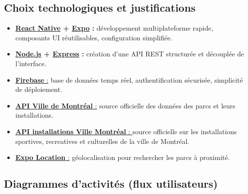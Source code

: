 \documentclass[12pt,a4paper]{article}
\begin{document}
\subsection{Choix technologiques et justifications}

\begin{itemize}
  \item \textbf{\href{https://reactnativeelements.com/docs}{React Native} + \href{https://expo.dev/}{Expo} :} développement multiplateforme rapide, composants UI réutilisables, configuration simplifiée.
  \item \textbf{\href{https://nodejs.org/fr}{Node.js} + \href{https://expressjs.com/}{Express} :} création d'une API REST structurée et découplée de l'interface.
  \item \href{https://www.googleadservices.com/pagead/aclk?sa=L&ai=DChsSEwiM4Orq6PmOAxViNwgFHbacK74YACICCAEQABoCbWQ&ae=2&co=1&ase=2&gclid=Cj0KCQjwndHEBhDVARIsAGh0g3CzPQvyJd7N1QFfaHlNtQieItuY35or26fmic90wBTJjrjov_X6acgaAh71EALw_wcB&ohost=www.google.com&cid=CAESeuD2dnsW8F6EJZBiaVN85dCR5-w8i7Bxvv0zbySgiBEsgnlWa9mX6tfoEvZI6bz1pF3d6ToXgs7VDoFJs4AabCc_2EMsFT3_-5KD6H5ks0JrQLvrG4FbyLgAoQt3RyvcFPnw3QdtBBGOQ776bJXTnpTxa3EGUF2VetWl&category=acrcp_v1_79&sig=AOD64_1rXZkpno1mca9k1OC4XcXaRW9hPQ&q&nis=4&adurl&ved=2ahUKEwiG7eXq6PmOAxVOv4kEHVFFJ2EQ0Qx6BAgJEAE}{\textbf{Firebase} :} base de données temps réel, authentification sécurisée, simplicité de déploiement.
  \item \href{https://donnees.montreal.ca/dataset/grands-parcs-parcs-d-arrondissements-et-espaces-publics}{\textbf{API Ville de Montréal} :} source officielle des données des parcs et leurs installations.
  \item \href{https://donnees.montreal.ca/dataset/installations-recreatives-sportives-et-culturelles}{\textbf{API installations Ville Montréal} : } source officielle sur les installations sportives, recreatives et culturelles de la ville de Montréal.
  \item \href{https://docs.expo.dev/versions/latest/sdk/location/}{\textbf{Expo Location} :} géolocalisation pour rechercher les parcs à proximité.
\end{itemize}

\subsection{Diagrammes d'activités (flux utilisateurs)}
\end{document}
